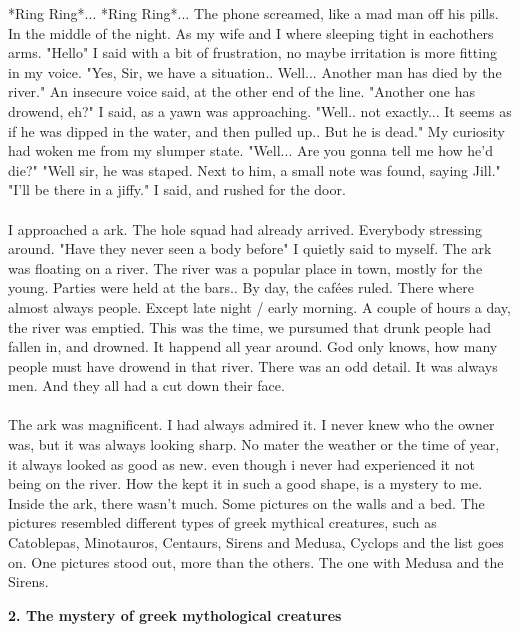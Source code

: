 \documentclass[]{article}
\begin{document}
*Ring Ring*... *Ring Ring*... The phone screamed, like a mad man off his pills. In the middle of the night. As my wife and I where sleeping tight in eachothers arms. "Hello" I said with a bit of frustration, no maybe irritation is more fitting in my voice. "Yes, Sir, we have a situation.. Well... Another man has died by the river." An insecure voice said, at the other end of the line. "Another one has drowend, eh?" I said, as a yawn was approaching. "Well.. not exactly... It seems as if he was dipped in the water, and then pulled up.. But he is dead." My curiosity had woken me from my slumper state. "Well... Are you gonna tell me how he'd die?" "Well sir, he was staped. Next to him, a small note was found, saying Jill." "I'll be there in a jiffy." I said, and rushed for the door.
\\ \\
I approached a ark. The hole squad had already arrived. Everybody stressing around. "Have they never seen a body before" I quietly said to myself. The ark was floating on a river. The river was a popular place in town, mostly for the young. Parties were held at the bars.. By day, the cafées ruled. There where almost always people. Except late night / early morning. A couple of hours a day, the river was emptied. This was the time, we pursumed that drunk people had fallen in, and drowned. It happend all year around. God only knows, how many people must have drowend in that river. There was an odd detail. It was always men. And they all had a cut down their face.
\\ \\
The ark was magnificent. I had always admired it. I never knew who the owner was, but it was always looking sharp. No mater the weather or the time of year, it always looked as good as new. even though i never had experienced it not being on the river. How the kept it in such a good shape, is a mystery to me. Inside the ark, there wasn't much. Some pictures on the walls and a bed. The pictures resembled different types of greek mythical  creatures, such as Catoblepas, Minotauros, Centaurs, Sirens and Medusa, Cyclops and the list goes on. One pictures stood out, more than the others. The one with Medusa and the Sirens.

\begin{center}
	\large\textbf{2. The mystery of greek mythological creatures}
\end{center}
\end{document}
